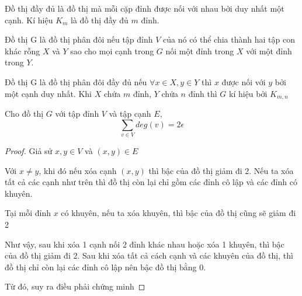 \begin{definition}
    Đồ thị đầy đủ là đồ thị mà mỗi cặp đỉnh được nối với nhau bởi duy nhất một cạnh. Kí hiệu $K_m$ là đồ thị đầy đủ $m$ đỉnh.

    Đồ thị G là đồ thị phân đôi nếu tập đỉnh $V$ của nó có thể chia thành hai tập con khác rỗng $X$ và $Y$ sao cho mọi cạnh trong $G$ nối một đỉnh trong $X$ với một đỉnh trong $Y$.

    Đồ thị G là đồ thị phân đôi đầy đủ nếu $\forall x \in X, y \in Y$ thì $x$ được nối với $y$ bởi một cạnh duy nhất.
    Khi $X$ chứa $m$ đỉnh, $Y$ chứa $n$ đỉnh thì $G$ kí hiệu bởi $K_{m,n}$
    \begin{center}
        \hspace{2cm}
    \end{center}
\end{definition}
\begin{theorem}
    \label{thr:v2e}
    Cho đồ thị $G$ với tập đỉnh $V$ và tập cạnh $E$, $$\sum_{v\in V}deg(v) = 2\epsilon$$
\end{theorem}
\begin{proof}

    Giả sử $x,y \in V$ và $(x,y) \in E$

    \indent Với $x \neq y$, khi đó nếu xóa cạnh $(x,y)$ thì bậc của đồ thị giảm đi 2. Nếu ta xóa tất cả các cạnh như trên thì đồ thị còn lại chỉ gồm các đỉnh cô lập và các đỉnh có khuyên.

    Tại mỗi đỉnh $x$ có khuyên, nếu ta xóa khuyên, thì bậc của đồ thị cũng sẽ giảm đi 2

    Như vậy, sau khi xóa 1 cạnh nối 2 đỉnh khác nhau hoặc xóa 1 khuyên, thì bậc của đồ thị giảm đi 2. Sau khi xóa tất cả cách cạnh và các khuyên của đồ thị, thì đồ thị chỉ còn lại các đỉnh cô lập nên bậc đồ thị bằng 0.

    Từ đó, suy ra điều phải chứng minh
\end{proof}
